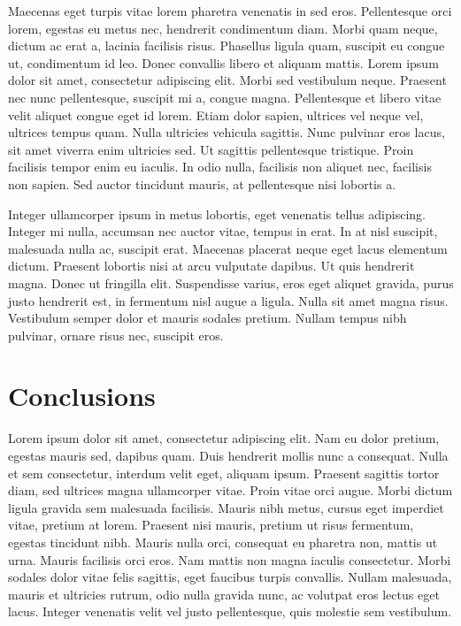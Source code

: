 \documentclass[extra,mreferee]{gji}
\begin{document}
Maecenas eget turpis vitae lorem pharetra venenatis in sed eros. Pellentesque
orci lorem, egestas eu metus nec, hendrerit condimentum diam. Morbi quam neque,
dictum ac erat a, lacinia facilisis risus. Phasellus ligula quam, suscipit eu
congue ut, condimentum id leo. Donec convallis libero et aliquam mattis. Lorem
ipsum dolor sit amet, consectetur adipiscing elit. Morbi sed vestibulum neque.
Praesent nec nunc pellentesque, suscipit mi a, congue magna. Pellentesque et
libero vitae velit aliquet congue eget id lorem. Etiam dolor sapien, ultrices
vel neque vel, ultrices tempus quam. Nulla ultricies vehicula sagittis. Nunc
pulvinar eros lacus, sit amet viverra enim ultricies sed. Ut sagittis
pellentesque tristique. Proin facilisis tempor enim eu iaculis. In odio nulla,
facilisis non aliquet nec, facilisis non sapien. Sed auctor tincidunt mauris,
at pellentesque nisi lobortis a.

Integer ullamcorper ipsum in metus lobortis, eget venenatis tellus adipiscing.
Integer mi nulla, accumsan nec auctor vitae, tempus in erat. In at nisl
suscipit, malesuada nulla ac, suscipit erat. Maecenas placerat neque eget lacus
elementum dictum. Praesent lobortis nisi at arcu vulputate dapibus. Ut quis
hendrerit magna. Donec ut fringilla elit. Suspendisse varius, eros eget aliquet
gravida, purus justo hendrerit est, in fermentum nisl augue a ligula. Nulla sit
amet magna risus. Vestibulum semper dolor et mauris sodales pretium. Nullam
tempus nibh pulvinar, ornare risus nec, suscipit eros.

\section{Conclusions}

Lorem ipsum dolor sit amet, consectetur adipiscing elit. Nam eu dolor pretium,
egestas mauris sed, dapibus quam. Duis hendrerit mollis nunc a consequat. Nulla
et sem consectetur, interdum velit eget, aliquam ipsum. Praesent sagittis
tortor diam, sed ultrices magna ullamcorper vitae. Proin vitae orci augue.
Morbi dictum ligula gravida sem malesuada facilisis. Mauris nibh metus, cursus
eget imperdiet vitae, pretium at lorem. Praesent nisi mauris, pretium ut risus
fermentum, egestas tincidunt nibh. Mauris nulla orci, consequat eu pharetra
non, mattis ut urna. Mauris facilisis orci eros. Nam mattis non magna iaculis
consectetur. Morbi sodales dolor vitae felis sagittis, eget faucibus turpis
convallis. Nullam malesuada, mauris et ultricies rutrum, odio nulla gravida
nunc, ac volutpat eros lectus eget lacus. Integer venenatis velit vel justo
pellentesque, quis molestie sem vestibulum.
\end{document}
